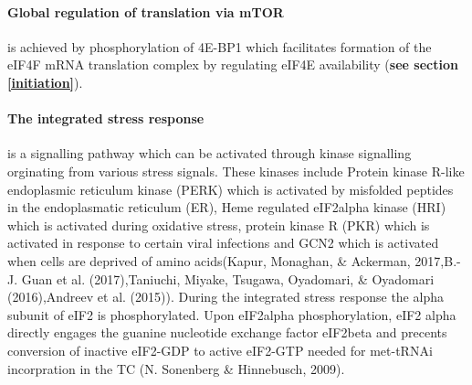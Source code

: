 \documentclass[12pt,openany]{book}
\begin{document}
\paragraph{Global regulation of translation via mTOR} \label{regmtor} is
achieved by phosphorylation of 4E-BP1 which facilitates formation of the
eIF4F mRNA translation complex by regulating eIF4E availability
(\textbf{see section \ref{initiation}}).

\paragraph{The integrated stress response}

is a signalling pathway which can be activated through kinase signalling
orginating from various stress signals. These kinases include Protein
kinase R-like endoplasmic reticulum kinase (PERK) which is activated by
misfolded peptides in the endoplasmatic reticulum (ER), Heme regulated
eIF2alpha kinase (HRI) which is activated during oxidative stress,
protein kinase R (PKR) which is activated in response to certain viral
infections and GCN2 which is activated when cells are deprived of amino
acids(Kapur, Monaghan, \& Ackerman, 2017,B.-J. Guan et al.
(2017),Taniuchi, Miyake, Tsugawa, Oyadomari, \& Oyadomari (2016),Andreev
et al. (2015)). During the integrated stress response the alpha subunit
of eIF2 is phosphorylated. Upon eIF2alpha phosphorylation, eIF2 alpha
directly engages the guanine nucleotide exchange factor eIF2beta and
precents conversion of inactive eIF2-GDP to active eIF2-GTP needed for
met-tRNAi incorpration in the TC (N. Sonenberg \& Hinnebusch, 2009).
\end{document}
